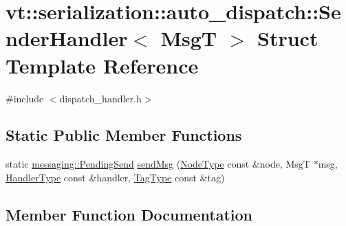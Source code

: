 \hypertarget{structvt_1_1serialization_1_1auto__dispatch_1_1_sender_handler}{}\section{vt\+:\+:serialization\+:\+:auto\+\_\+dispatch\+:\+:Sender\+Handler$<$ MsgT $>$ Struct Template Reference}
\label{structvt_1_1serialization_1_1auto__dispatch_1_1_sender_handler}


{\ttfamily \#include $<$dispatch\+\_\+handler.\+h$>$}

\subsection*{Static Public Member Functions}
\begin{DoxyCompactItemize}
\item 
static \hyperlink{structvt_1_1messaging_1_1_pending_send}{messaging\+::\+Pending\+Send} \hyperlink{structvt_1_1serialization_1_1auto__dispatch_1_1_sender_handler_a4950136f0c28708c49f7d46613d5d43d}{send\+Msg} (\hyperlink{namespacevt_a866da9d0efc19c0a1ce79e9e492f47e2}{Node\+Type} const \&node, MsgT $\ast$msg, \hyperlink{namespacevt_af64846b57dfcaf104da3ef6967917573}{Handler\+Type} const \&handler, \hyperlink{namespacevt_a84ab281dae04a52a4b243d6bf62d0e52}{Tag\+Type} const \&tag)
\end{DoxyCompactItemize}


\subsection{Member Function Documentation}
\mbox{\label{structvt_1_1serialization_1_1auto__dispatch_1_1_sender_handler_a4950136f0c28708c49f7d46613d5d43d}} 
